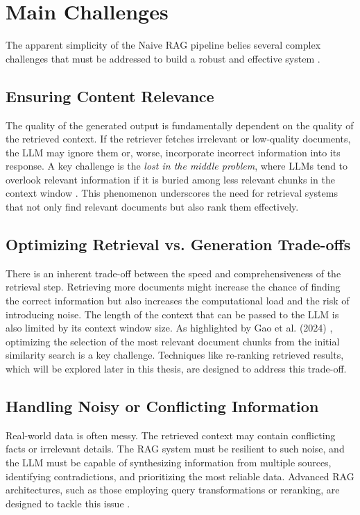 \section{Main Challenges}
The apparent simplicity of the Naive RAG pipeline belies several complex challenges that must be addressed to build a robust and effective system \autocite{gao2024retrievalaugmented}.

\subsection{Ensuring Content Relevance}
The quality of the generated output is fundamentally dependent on the quality of the retrieved context. If the retriever fetches irrelevant or low-quality documents, the LLM may ignore them or, worse, incorporate incorrect information into its response. A key challenge is the \textit{lost in the middle problem}, where LLMs tend to overlook relevant information if it is buried among less relevant chunks in the context window \autocite{liu2023lost}. This phenomenon underscores the need for retrieval systems that not only find relevant documents but also rank them effectively.

\subsection{Optimizing Retrieval vs. Generation Trade-offs}
There is an inherent trade-off between the speed and comprehensiveness of the retrieval step. Retrieving more documents might increase the chance of finding the correct information but also increases the computational load and the risk of introducing noise. The length of the context that can be passed to the LLM is also limited by its context window size. As highlighted by Gao et al. (2024) \autocite{gao2024retrievalaugmented}, optimizing the selection of the most relevant document chunks from the initial similarity search is a key challenge. Techniques like re-ranking retrieved results, which will be explored later in this thesis, are designed to address this trade-off.

\subsection{Handling Noisy or Conflicting Information}
Real-world data is often messy. The retrieved context may contain conflicting facts or irrelevant details. The RAG system must be resilient to such noise, and the LLM must be capable of synthesizing information from multiple sources, identifying contradictions, and prioritizing the most reliable data. Advanced RAG architectures, such as those employing query transformations or reranking, are designed to tackle this issue \autocite{gao2024retrievalaugmented, rag_fusion_2024}.

